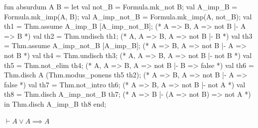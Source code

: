 \nwenddocs{}\endmoddef\nwstartdeflinemarkup{}\nwenddeflinemarkup
fun absurdum A B =
  let
    val not_B = Formula.mk_not B;
    val A_imp_B = Formula.mk_imp(A, B);
    val A_imp_not_B = Formula.mk_imp(A, not_B);
    val th1 = Thm.assume A_imp_B [A_imp_not_B]; (* A => B, A => not B |- A => B *)
    val th2 = Thm.undisch th1;                  (* A, A => B, A => not B |- B *)
    val th3 = Thm.assume A_imp_not_B [A_imp_B]; (* A => B, A => not B |- A => not B *)
    val th4 = Thm.undisch th3;                  (* A, A => B, A => not B |- not B *)
    val th5 = Thm.not_elim th4;                 (* A, A => B, A => not B |- B => false *)
    val th6 = Thm.disch A (Thm.modus_ponens th5 th2); (* A => B, A => not B |- A => false *)
    val th7 = Thm.not_intro th6;                (* A => B, A => not B |- not A *)
    val th8 = Thm.disch A_imp_not_B th7;        (* A => B |- (A => not B) => not A *)
  in
    Thm.disch A_imp_B th8
  end;
\eatline
{}\nwendcode{}\nwdocspar
\begin{node}
$\vdash A\lor A\implies A$
\end{node}

